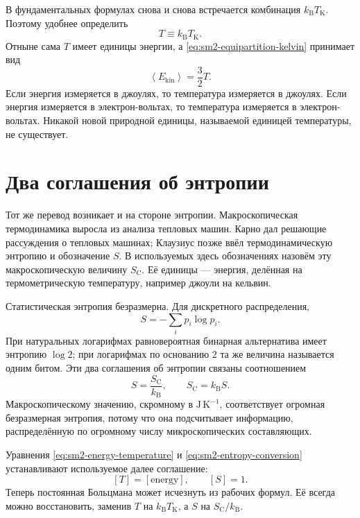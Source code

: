 В фундаментальных формулах снова и снова встречается комбинация \(k_{\mathrm B}T_{\mathrm K}\). Поэтому удобнее определить
\begin{equation}
 T\equiv k_{\mathrm B}T_{\mathrm K}.
 \label{eq:sm2-energy-temperature}
\end{equation}
Отныне сама \(T\) имеет единицы энергии, а
\eqref{eq:sm2-equipartition-kelvin} принимает вид
\begin{equation}
 \left\langle E_{\mathrm{kin}}\right\rangle=\frac{3}{2}T.
 \label{eq:sm2-equipartition-natural}
\end{equation}
Если энергия измеряется в джоулях, то температура измеряется в джоулях. Если энергия измеряется в электрон-вольтах, то температура измеряется в электрон-вольтах. Никакой новой природной единицы, называемой единицей температуры, не существует.

\section{Два соглашения об энтропии}

Тот же перевод возникает и на стороне энтропии. Макроскопическая термодинамика выросла из анализа тепловых машин. Карно дал решающие рассуждения о тепловых машинах; Клаузиус позже ввёл термодинамическую энтропию и обозначение \(S\). В используемых здесь обозначениях назовём эту макроскопическую величину \(S_{\mathrm C}\). Её единицы — энергия, делённая на термометрическую температуру, например джоули на кельвин.

Статистическая энтропия безразмерна. Для дискретного распределения,
\begin{equation}
 S=-\sum_i p_i\log p_i.
 \label{eq:sm2-statistical-entropy}
\end{equation}
При натуральных логарифмах равновероятная бинарная альтернатива имеет энтропию \(\log2\); при логарифмах по основанию 2 та же величина называется одним битом. Эти два соглашения об энтропии связаны соотношением
\begin{equation}
 S=\frac{S_{\mathrm C}}{k_{\mathrm B}},
 \qquad
 S_{\mathrm C}=k_{\mathrm B}S.
 \label{eq:sm2-entropy-conversion}
\end{equation}
Макроскопическому значению, скромному в \(\mathrm{J\,K^{-1}}\), соответствует огромная безразмерная энтропия, потому что она подсчитывает информацию, распределённую по огромному числу микроскопических составляющих.

Уравнения \eqref{eq:sm2-energy-temperature} и
\eqref{eq:sm2-entropy-conversion} устанавливают используемое далее соглашение:
\[
 [T]=[\text{energy}],
 \qquad
 [S]=1.
\]
Теперь постоянная Больцмана может исчезнуть из рабочих формул. Её всегда можно восстановить, заменив \(T\) на \(k_{\mathrm B}T_{\mathrm K}\), а
\(S\) на \(S_{\mathrm C}/k_{\mathrm B}\).

